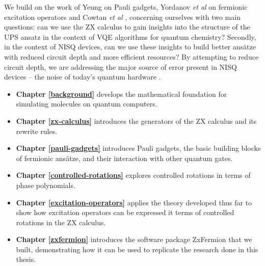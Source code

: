 We build on the work of Yeung \cite{Yeung2020} on Pauli gadgets, Yordanov \textit{et al} \cite{Yordanov2020} on fermionic excitation operators and Cowtan \textit{et al} \cite{Cowtan2020}, concerning ourselves with two main questions: can we use the ZX calculus to gain insights into the structure of the UPS ansatz in the context of VQE algorithms for quantum chemistry? Secondly, in the context of NISQ devices, can we use these insights to build better ansätze with reduced circuit depth and more efficient resources? By attempting to reduce circuit depth, we are addressing the major source of error present in NISQ devices -- the noise of today's quantum hardware \cite{Cowtan2020}.

\begin{itemize}
    \item \textbf{Chapter \ref{background}} develops the mathematical foundation for simulating molecules on quantum computers.
    \item \textbf{Chapter \ref{zx-calculus}} introduces the generators of the ZX calculus and its rewrite rules.
    \item \textbf{Chapter \ref{pauli-gadgets}} introduces Pauli gadgets, the basic building blocks of fermionic ansätze, and their interaction with other quantum gates.
    \item \textbf{Chapter \ref{controlled-rotations}} explores controlled rotations in terms of phase polynomials.
    \item \textbf{Chapter \ref{excitation-operators}} applies the theory developed thus far to show how excitation operators can be expressed it terms of controlled rotations in the ZX calculus.
    \item \textbf{Chapter \ref{zxfermion}} introduces the software package ZxFermion that we built, demonstrating how it can be used to replicate the research done in this thesis.
\end{itemize}
